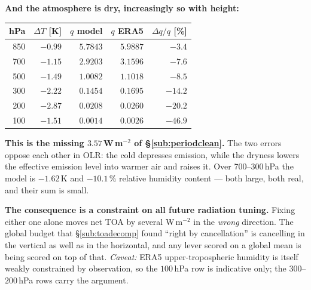 \documentclass[10pt]{article}
\begin{document}
\textbf{And the atmosphere is dry, increasingly so with height:}

\begin{center}\footnotesize
\begin{tabular}{r r r r r}
\toprule
hPa & $\Delta T$ [K] & $q$ model & $q$ ERA5 & $\Delta q/q$ [\%] \\
\midrule
 850 & $-0.99$ & $5.7843$ & $5.9887$ & $-3.4$ \\
 700 & $-1.15$ & $2.9203$ & $3.1596$ & $-7.6$ \\
 500 & $-1.49$ & $1.0082$ & $1.1018$ & $-8.5$ \\
 300 & $-2.22$ & $0.1454$ & $0.1695$ & $\mathbf{-14.2}$ \\
 200 & $-2.87$ & $0.0208$ & $0.0260$ & $\mathbf{-20.2}$ \\
 100 & $-1.51$ & $0.0014$ & $0.0026$ & $-46.9$ \\
\bottomrule
\end{tabular}
\end{center}

\noindent \textbf{This is the missing $3.57$\,W\,m$^{-2}$ of \S\ref{sub:periodclean}.} The
two errors oppose each other in OLR: the cold depresses emission, while the dryness lowers
the effective emission level into warmer air and raises it. Over 700--300\,hPa the model is
$-1.62$\,K and $-10.1\,\%$ relative humidity content --- both large, both real, and their
sum is small.

\textbf{The consequence is a constraint on all future radiation tuning.} Fixing either one
alone moves net TOA by several W\,m$^{-2}$ in the \emph{wrong} direction. The global budget
that \S\ref{sub:toadecomp} found ``right by cancellation'' is cancelling in the vertical as
well as in the horizontal, and any lever scored on a global mean is being scored on top of
that. \emph{Caveat:} ERA5 upper-tropospheric humidity is itself weakly constrained by
observation, so the $100$\,hPa row is indicative only; the $300$--$200$\,hPa rows carry the
argument.
\end{document}
